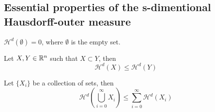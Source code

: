 \documentclass[11pt]{ekblite}
\begin{document}
\subsection{Essential properties of the s-dimentional Hausdorff-outer measure}
\begin{corollary}
	$\mathcal{H}^d(\emptyset) = 0$, where $\emptyset$ is the empty set.
\end{corollary}

\begin{corollary}
	Let $X,Y \in \mathbb{R}^n$ such that $X \subset Y$, then
	\[\mathcal{H}^d (X) \le\mathcal{H}^d (Y)\]
\end{corollary}

\begin{corollary}
	Let $\{X_i\}$ be a collection of sets, then
	\[\mathcal{H}^d \left( \bigcup_{i=0}^{\infty} X_i \right) \le \sum_{i=0}^{\infty} \mathcal{H}^d (X_i)\]
\end{corollary}


\newpage
\end{document}
